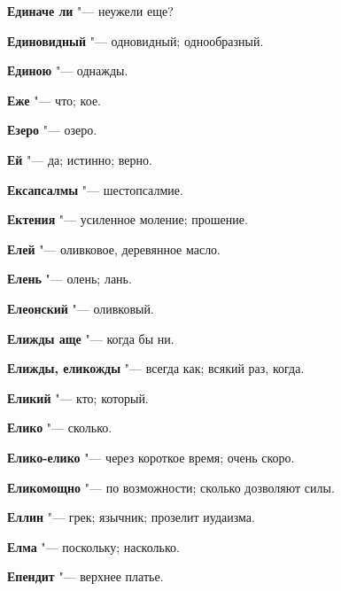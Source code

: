 \begin{mymulticols}{2}
\noindent\textbf{Единаче ли} "--- неужели еще? 




\noindent\textbf{Единовидный} "--- одновидный; однообразный. 




\noindent\textbf{Единою} "--- однажды. 




\noindent\textbf{Еже} "--- что; кое. 




\noindent\textbf{Езеро} "--- озеро. 




\noindent\textbf{Ей} "--- да; истинно; верно. 




\noindent\textbf{Ексапсалмы} "--- шестопсалмие. 




\noindent\textbf{Ектения} "--- усиленное моление; прошение. 




\noindent\textbf{Елей} "--- оливковое, деревянное масло. 




\noindent\textbf{Елень} "--- олень; лань. 




\noindent\textbf{Елеонский} "--- оливковый. 




\noindent\textbf{Елижды аще} "--- когда бы ни. 




\noindent\textbf{Елижды, еликожды} "--- всегда как; всякий раз, когда. 




\noindent\textbf{Еликий} "--- кто; который. 




\noindent\textbf{Елико} "--- сколько. 




\noindent\textbf{Елико-елико} "--- через короткое время; очень скоро. 




\noindent\textbf{Еликомощно} "--- по возможности; сколько дозволяют силы. 




\noindent\textbf{Еллин} "--- грек; язычник; прозелит иудаизма. 




\noindent\textbf{Елма} "--- поскольку; насколько. 




\noindent\textbf{Епендит} "--- верхнее платье. 





\end{mymulticols}
